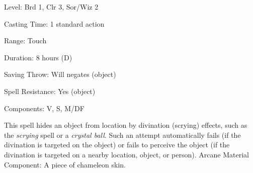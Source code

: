 
\begin{description*}
\item[Level:] Brd 1, Clr 3, Sor/Wiz 2
\item[Casting Time:] 1 standard action
\item[Range:] Touch
\item[Duration:] 8 hours (D)
\item[Saving Throw:] Will negates (object)
\item[Spell Resistance:] Yes (object)
\item[Components:] V, S, M/DF
\end{description*}

This spell hides an object from location by divination (scrying) effects, such
as the \textit{scrying} spell or a \textit{crystal ball}. Such an attempt automatically
fails (if the divination is targeted on the object) or fails to perceive the object
(if the divination is targeted on a nearby location, object, or person).
Arcane Material Component: A piece of chameleon skin.